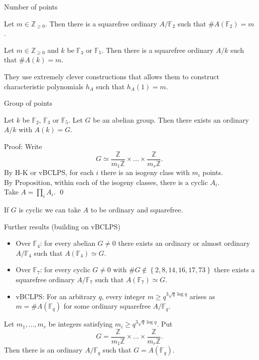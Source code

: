 \documentclass[usenames,dvipsnames,handout]{beamer}
\def\Z{\mathbb{Z}}
\def\F{\mathbb{F}}
\newcommand{\set}[1]{\left\lbrace#1\right\rbrace }
\begin{document}
\begin{frame}{ Number of points }
    \begin{theorem}
        Let $m\in\Z_{\geq 0}$. Then there is a squarefree ordinary $A/\F_2$ such that $\#A(\F_2)=m$.
    \end{theorem}
    \pause
    \begin{theorem}
        Let $m\in\Z_{\geq 0}$ and $k$ be $\F_3$ or $\F_5$. Then there is a squarefree ordinary $A/k$ such that $\#A(k)=m$.
    \end{theorem}
    \pause
    They use extremely clever constructions that allows them to construct characteristic polynomials $h_A$ such that $h_A(1)=m$.
\end{frame}

\begin{frame}{ Group of points }
    \begin{theorem}[M.-Springer]
        Let $k$ be $\F_2$, $\F_3$ or $\F_5$. Let $G$ be an abelian group.
        \pause
        Then there exists an ordinary $A/k$ with $A(k) = G$.
    \end{theorem}
    \pause
    Proof: Write
    \[ G\simeq \frac{\Z}{m_1 \Z} \times \ldots \times \frac{\Z}{m_s \Z}.\]
    \pause
    By H-K or vBCLPS, for each $i$ there is an isogeny class with $m_i$ points.\\
    \pause
    By Proposition, within each of the isogeny classes, there is a cyclic $A_i$.\\
    \pause
    Take $A=\prod_i A_i$. \qed
    \pause
    \begin{corollary}
        If $G$ is cyclic we can take $A$ to be ordinary and squarefree.
    \end{corollary}
\end{frame}

\begin{frame}{ Further results (building on vBCLPS) }
	\begin{itemize}
        \pause
        \item Over $\F_4$: for every abelian $G\neq 0$ there exists an ordinary or almost ordinary $A/\F_4$ such that $A(\F_4)\simeq G$.
        \pause
        \item Over $\F_7$: for every cyclic $G\neq 0$ with $\# G\not \in \set{2,8,14,16,17,73}$ there exists a squarefree ordinary $A/\F_7$ such that $A(\F_7)\simeq G$.
        \pause
        \item vBCLPS: For an arbitrary $q$, every integer $m\geq q^{3\sqrt{q}\log q}$ arises as $m=\#A(\F_q)$ for some ordinary squarefree $A/\F_q$.
	\end{itemize}
    \pause
    \begin{theorem}[M.-Springer]
        Let $m_1,\ldots,m_r$ be integers satisfying $m_i\geq q^{3\sqrt{q}\log q}$.
        Put
        \[ G=\frac{\Z}{m_1 \Z}\times \ldots \times \frac{\Z}{m_r \Z}. \]
        \pause
        Then there is an ordinary $A/\F_q$ such that $G=A(\F_q)$.
    \end{theorem}
\end{frame}
\end{document}
